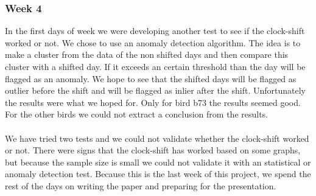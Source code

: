 \documentclass[a4paper]{article}
\begin{document}
\subsubsection*{Week 4}
In the first days of week we were developing another test to see if the clock-shift  worked or not. We chose to use an anomaly detection algorithm. The idea is to make a cluster from the data of the non shifted days and then compare this cluster with a shifted day. If it exceeds an certain threshold than the day will be flagged as an anomaly. We hope to see that the shifted days will be flagged as outlier before the shift and will be flagged as inlier after the shift. Unfortunately the results were what we hoped for. Only for bird b73 the results seemed good. For the other birds we could not extract a conclusion from the results.\\\\We have tried two tests and we could not validate whether the clock-shift worked or not. There were signs that the clock-shift has worked based on some graphs, but because the sample size is small we could not validate it with an statistical or anomaly detection test. Because this is the last week of this project, we spend the rest of the days on writing the paper and preparing for the presentation. 
\end{document}
